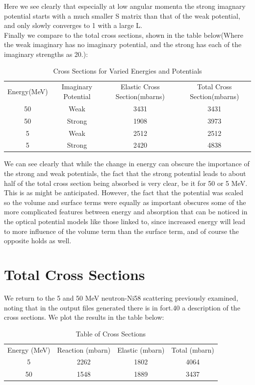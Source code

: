 \documentclass[paper=a4, fontsize=11pt]{scrartcl} %
\numberwithin{equation}{section} %
\numberwithin{figure}{section} %
\numberwithin{table}{section} %
\begin{document}
Here we see clearly that especially at low angular momenta the strong imagnary potential starts with a much smaller S matrix than that of the weak potential, and only slowly converges to 1 with a large L. \\

Finally we compare to the total cross sections, shown in the table below(Where the weak imaginary has no imaginary potential, and the strong has each of the imaginary strengths as 20.):\\
\begin{table}[hbt!]
\centering
\begin{tabular} {|c|c|c|c|}
Energy(MeV) & Imaginary Potential & Elastic Cross Section(mbarns) & Total Cross Section(mbarns)\\
50 & Weak & 3431 & 3431\\
50 & Strong & 1908 & 3973\\
5 & Weak & 2512 & 2512 \\
5 & Strong & 2420 & 4838 \end{tabular}\caption{Cross Sections for Varied Energies and Potentials}\end{table}

We can see clearly that while the change in energy can obscure the importance of the strong and weak potentials, the fact that the strong potential leads to about half of the total cross section being absorbed is very clear, be it for 50 or 5 MeV. This is as might be anticipated. However, the fact that the potential was scaled so the volume and surface terms were equally as important obscures some of the more complicated features between energy and absorption that can be noticed in the optical potential models like those linked to, since increased energy will lead to more influence of the volume term than the surface term, and of course the opposite holds as well. 

\section{Total Cross Sections}

We return to the 5 and 50 MeV neutron-Ni58 scattering previously examined, noting that in the output files generated there is in fort.40 a description of the cross sections. We plot the results in the table below:\\

\begin{table}[hbt!]
\centering
\begin{tabular}{|c|c|c|c|}
Energy (MeV) & Reaction  (mbarn) & Elastic (mbarn)& Total (mbarn)\\
5 & 2262 & 1802 & 4064 \\
50 & 1548 &1889 & 3437 
\end{tabular}
\caption{Table of Cross Sections}
\end{table}
\end{document}
